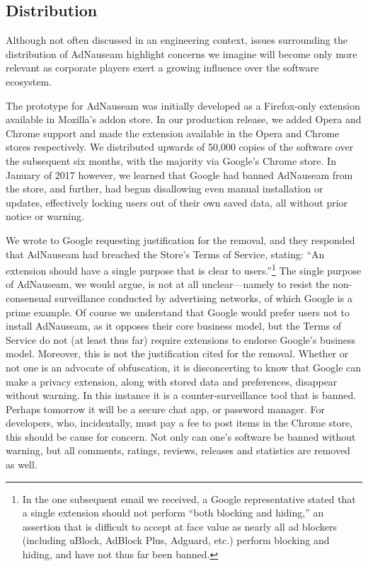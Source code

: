 \documentclass[conference]{IEEEtran}
\begin{document}
\subsection{Distribution}

Although not often discussed in an engineering context, issues surrounding the distribution of AdNauseam highlight concerns we imagine will become only more relevant as corporate players exert a growing influence over the software ecosystem.

The prototype for AdNauseam was initially developed as a Firefox-only extension available in  Mozilla's addon store. In our production release, we added Opera and Chrome support and made the extension available in the Opera and Chrome stores respectively. We distributed upwards of 50,000 copies of the software over the subsequent six months, with the majority via Google's Chrome store. In January of 2017 however, we learned that Google had banned AdNauseam from the store, and further, had begun disallowing even manual installation or updates, effectively locking users out of their own saved data, all without prior notice or warning.

We wrote to Google requesting justification for the removal, and they responded that AdNauseam had breached the Store's Terms of Service, stating: “An extension should have a single purpose that is clear to users.”\footnote{In the one subsequent email we received, a Google representative stated that a single extension should not perform “both blocking and hiding,” an assertion that is difficult to accept at face value as nearly all ad blockers (including uBlock, AdBlock Plus, Adguard, etc.) perform blocking and hiding, and have not thus far been banned.} The single purpose of AdNauseam, we would argue, is not at all unclear---namely to resist the non-consensual surveillance conducted by advertising networks, of which Google is a prime example. Of course we understand that Google would prefer users not to install AdNauseam, as it opposes their core business model, but the Terms of Service do not (at least thus far) require extensions to endorse Google's business model. Moreover, this is not the justification cited for the removal. Whether or not one is an advocate of obfuscation, it is disconcerting to know that Google can make a privacy extension, along with stored data and preferences, disappear without warning. In this instance it is a counter-surveillance tool that is banned. Perhaps tomorrow it will be a secure chat app, or password manager. For developers, who, incidentally, must pay a fee to post items in the Chrome store, this should be cause for concern. Not only can one's software be banned without warning, but all comments, ratings, reviews, releases and statistics are removed as well.
\end{document}
